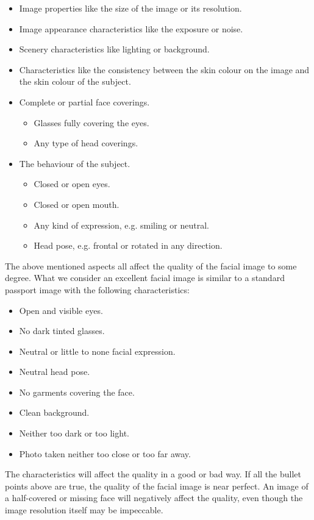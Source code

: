 \begin{itemize}
    \item Image properties like the size of the image or its resolution.
    \item Image appearance characteristics like the exposure or noise.
    \item Scenery characteristics like lighting or background.
    \item Characteristics like the consistency between the skin colour on the image and the skin colour of the subject.
    \item Complete or partial face coverings.
    \begin{itemize}
        \item Glasses fully covering the eyes.
        \item Any type of head coverings.
    \end{itemize}
    \item The behaviour of the subject.
    \begin{itemize}
        \item Closed or open eyes.
        \item Closed or open mouth.
        \item Any kind of expression, e.g. smiling or neutral.
        \item Head pose, e.g. frontal or rotated in any direction.
    \end{itemize}
\end{itemize}

The above mentioned aspects all affect the quality of the facial image to some degree. What we consider an excellent facial image is similar to a standard passport image with the following characteristics: 
\begin{itemize}
    \item Open and visible eyes.
    \item No dark tinted glasses. 
    \item Neutral or little to none facial expression.
    \item Neutral head pose.
    \item No garments covering the face.
    \item Clean background.
    \item Neither too dark or too light.
    \item Photo taken neither too close or too far away.
\end{itemize}

The characteristics will affect the quality in a good or bad way. If all the bullet points above are true, the quality of the facial image is near perfect. An image of a half-covered or missing face will negatively affect the quality, even though the image resolution itself may be impeccable. 

